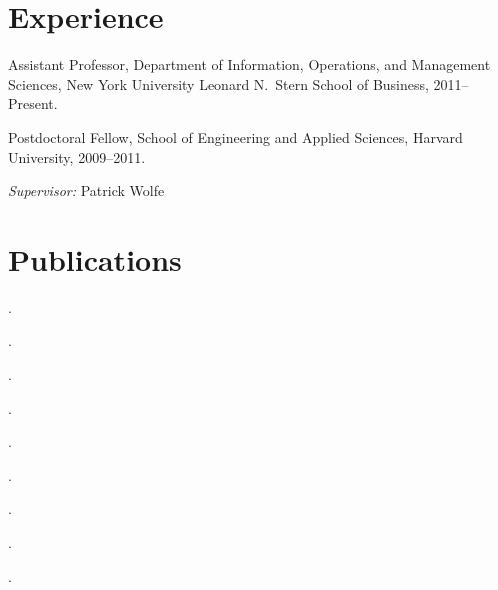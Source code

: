 \documentclass[10pt,letterpaper]{article}
\renewenvironment{itemize}{
  \begin{list}{}{
    \setlength{\leftmargin}{1.5em}
    \setlength{\itemsep}{0.25em}
    \setlength{\parskip}{0pt}
    \setlength{\parsep}{0.25em}
  }
}{
  \end{list}
}
\begin{document}
\section*{Experience}

\begin{itemize}
\item Assistant Professor, Department of Information, Operations, and
  Management Sciences, New York University Leonard N.~Stern School of Business,
  2011--Present.
\item Postdoctoral Fellow, School of Engineering and Applied Sciences, Harvard
  University, 2009--2011.
  \begin{itemize}
  \item \textit{Supervisor:} Patrick Wolfe
  \end{itemize}
\end{itemize}






\section*{Publications}

\begin{itemize}
\item {}.
\item {}.
\item {}.
\item {}.
\item {}.
\item {}.
\item {}.
\item {}.
\item {}.
\end{itemize}
\end{document}
